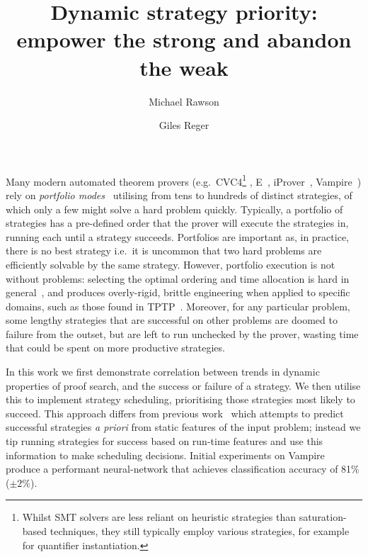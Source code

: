 \documentclass{easychair}
\title{Dynamic strategy priority: \\ empower the strong and abandon the weak}
\author{
 Michael Rawson \and 
 Giles Reger
}
\institute{University of Manchester, Manchester, UK}
\newcommand{\Vampire}{{Vampire}}
\newcommand{\vampire}{\Vampire}
\newcommand{\iprover}{iProver}
\begin{document}
\maketitle
Many modern automated theorem provers (e.g.\ CVC4\footnote{Whilst SMT solvers are less reliant on heuristic strategies than saturation-based techniques, they still typically employ various strategies, for example for quantifier instantiation.} \cite{CVC4}, E{}~\cite{E}, \iprover{}~\cite{iProver}, \vampire{}~\cite{Vampire}) rely on \emph{portfolio modes}~\cite{portfolio} utilising from tens to hundreds of distinct strategies, of which only a few might solve a hard problem quickly.
Typically, a portfolio of strategies has a pre-defined order that the prover will execute the strategies in, running each until a strategy succeeds. 
Portfolios are important as, in practice, there is no best strategy i.e.\ it is uncommon that two hard problems are efficiently solvable by the same strategy.
However, portfolio execution is not without problems: selecting the optimal ordering and time allocation is hard in general~\cite{predict-success}, and produces overly-rigid, brittle engineering when applied to specific domains, such as those found in TPTP~\cite{TPTP}.
Moreover, for any particular problem, some lengthy strategies that are successful on other problems are doomed to failure from the outset, but are left to run unchecked by the prover, wasting time that could be spent on more productive strategies.

In this work we first demonstrate correlation between trends in dynamic properties of proof search, and the success or failure of a strategy.
We then utilise this to implement strategy scheduling, prioritising those strategies most likely to succeed.
This approach differs from previous work~\cite{E,static1,static2} which attempts to predict successful strategies \emph{a priori} from static features of the input problem; instead we tip running strategies for success based on run-time features and use this information to make scheduling decisions. 
Initial experiments on Vampire produce a performant neural-network that achieves classification accuracy of 81\% (\(\pm 2\%\)).
\end{document}
